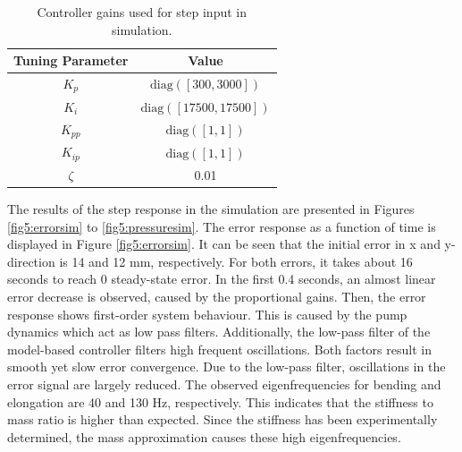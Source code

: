 \begin{table}[H]
    \centering
     \caption{Controller gains used for step input in simulation.}
    \begin{tabular}{|c|c|} \hline
     \textbf{Tuning Parameter}    & \textbf{Value}  \\ \hline
    $K_p$ & $\text{diag}([300,3000])$  \\ \hline
    $K_i$ & $\text{diag}([17500,17500])$  \\ \hline
    $K_{pp}$ & $\text{diag}([1,1])$  \\ \hline
    $K_{ip}$ & $\text{diag}([1,1])$ \\ \hline
    $\zeta$ & 0.01 \\ \hline
    \end{tabular}

    \label{tab5:gainssim}
\end{table}

The results of the step response in the simulation are presented in Figures \ref{fig5:errorsim} to \ref{fig5:pressuresim}. The error response as a function of time is displayed in Figure \ref{fig5:errorsim}. It can be seen that the initial error in x and y-direction is 14 and 12 mm, respectively. For both errors, it takes about 16 seconds to reach 0 steady-state error. In the first 0.4 seconds, an almost linear error decrease is observed, caused by the proportional gains. Then, the error response shows first-order system behaviour. This is caused by the pump dynamics which act as low pass filters. Additionally, the low-pass filter of the model-based controller filters high frequent oscillations. Both factors result in smooth yet slow error convergence. Due to the low-pass filter, oscillations in the error signal are largely reduced. The observed eigenfrequencies for bending and elongation are 40 and 130 Hz, respectively. This indicates that the stiffness to mass ratio is higher than expected. Since the stiffness has been experimentally determined, the mass approximation causes these high eigenfrequencies.



